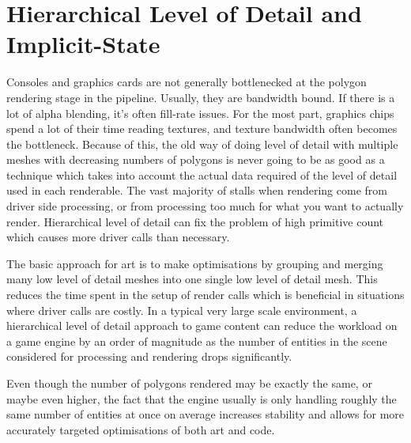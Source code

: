 \documentclass[a4paper,12pt]{article}
\begin{document}
\newpage
\section{Hierarchical Level of Detail and Implicit-State}

Consoles and graphics cards are not generally bottlenecked at the polygon rendering stage in the pipeline.
Usually, they are bandwidth bound.
If there is a lot of alpha blending, it's often fill-rate issues.
For the most part, graphics chips spend a lot of their time reading textures, and texture bandwidth often becomes the bottleneck.
Because of this, the old way of doing level of detail with multiple meshes with decreasing numbers of polygons is never going to be as good as a technique which takes into account the actual data required of the level of detail used in each renderable.
The vast majority of stalls when rendering come from driver side processing, or from processing too much for what you want to actually render.
Hierarchical level of detail can fix the problem of high primitive count which causes more driver calls than necessary.

The basic approach for art is to make optimisations by grouping and merging many low level of detail meshes into one single low level of detail mesh.
This reduces the time spent in the setup of render calls which is beneficial in situations where driver calls are costly.
In a typical very large scale environment, a hierarchical level of detail approach to game content can reduce the workload on a game engine by an order of magnitude as the number of entities in the scene considered for processing and rendering drops significantly.

Even though the number of polygons rendered may be exactly the same, or maybe even higher, the fact that the engine usually is only handling roughly the same number of entities at once on average increases stability and allows for more accurately targeted optimisations of both art and code.
\end{document}
